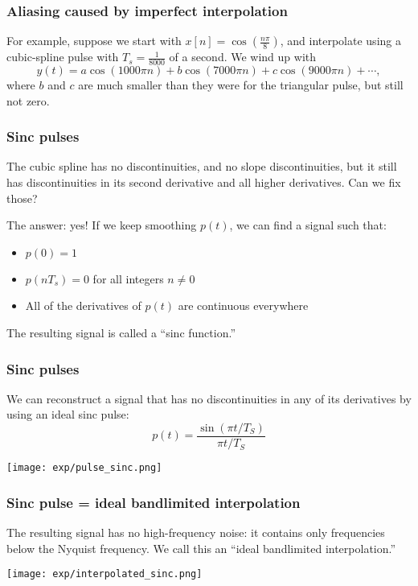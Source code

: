 \documentclass{beamer}
\begin{document}
\begin{frame}
  \frametitle{Aliasing caused by imperfect interpolation}

  For example, suppose we start with
  $x[n]=\cos\left(\frac{n\pi}{8}\right)$, and interpolate using a
  cubic-spline pulse with $T_s=\frac{1}{8000}$ of a second.  We wind up
  with
  \begin{displaymath}
    y(t) = a\cos\left(1000\pi n\right)+b\cos\left(7000\pi n\right)+c\cos\left(9000\pi n\right)+\cdots,
  \end{displaymath}
  where $b$ and $c$ are much smaller than they were for the triangular pulse, but
  still not zero. 
\end{frame}

\begin{frame}
  \frametitle{Sinc pulses}

  The cubic spline has no discontinuities, and no slope  discontinuities, but it still has
  discontinuities in its second derivative and all higher derivatives.  Can we fix those?

  The answer: yes!  If we keep smoothing $p(t)$, we can find a signal such that:
  \begin{itemize}
  \item $p(0)=1$
  \item $p(nT_s)=0$ for all integers $n\ne 0$
  \item All of the derivatives of $p(t)$ are continuous everywhere
  \end{itemize}
  The resulting signal is called a ``sinc function.''
\end{frame}
  
\begin{frame}
  \frametitle{Sinc pulses}

  We can reconstruct a signal that has  no discontinuities in any of its derivatives
  by using an  ideal sinc pulse:
  \begin{displaymath}
    p(t) = \frac{\sin(\pi t/T_S)}{\pi t/T_S}
  \end{displaymath}

  \centerline{\texttt{[image: exp/pulse\_sinc.png]}}

\end{frame}

\begin{frame}
  \frametitle{Sinc pulse = ideal bandlimited interpolation}

  The resulting signal has no high-frequency noise: it contains only
  frequencies below the Nyquist frequency. We call this an ``ideal
  bandlimited interpolation.''

  \centerline{\texttt{[image: exp/interpolated\_sinc.png]}}  
\end{frame}
\end{document}
